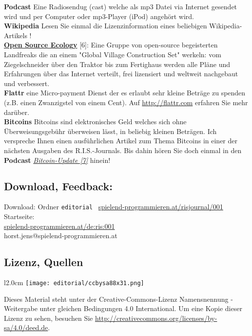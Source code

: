 \documentclass[10pt,a4paper,ngerman,twoside]{article} %
\begin{document}
\textbf{Podcast} Eine Radiosendug (cast) welche als mp3 Datei via Internet gesendet wird und per Computer oder mp3-Player (iPod) angehört wird. \\

\textbf{Wikipedia} Lesen Sie einmal die Lizenzinformation eines beliebigen Wikipedia-Artikels ! \\

\href{http://opensourceecology.org/}{\textbf{Open Source Ecology}} [6]: Eine Gruppe von open-source begeisterten  Landfreaks die an einem "Global Village Construction Set" werkeln: vom Ziegelschneider über den Traktor bis zum Fertighaus werden alle Pläne und Erfahrungen über das Internet verteilt, frei lizensiert und weltweit nachgebaut und verbessert.\\

\textbf{Flattr} eine Micro-payment Dienst der es erlaubt sehr kleine Beträge  zu spenden (z.B. einen Zwanzigstel von einem Cent). Auf \url{http://flattr.com} erfahren Sie mehr darüber.\\

\textbf{Bitcoins} Bitcoins sind elektronisches Geld welches sich ohne Überweisungsgebühr überweisen lässt, in beliebig kleinen Beträgen. Ich verspreche Ihnen einen ausführlichen Artikel zum Thema Bitcoins in einer der nächsten Ausgaben des R.I.S.-Journals. Bis dahin hören Sie doch einmal in den \textbf{Podcast}  \href{http://www.bitcoinupdate.com/}{\textit{Bitcoin-Update [7]}} hinein!

\subsection*{Download, Feedback:}
\footnotesize{
Download: Ordner \texttt{editorial} \Mundus\ \href{http://spielend-programmieren.at/risjournal/001}{spielend-programmieren.at/risjournal/001}\\
Startseite:\\
\href{http://spielend-programmieren.at/de:ris:001}{spielend-programmieren.at/de:ris:001}\\ 
\Letter\: horst.jens@spielend-programmieren.at}
\normalsize

\subsection*{Lizenz, Quellen} 
\begin{wrapfigure}{l}{2.0cm}
\texttt{[image: editorial/ccbysa88x31.png]}
\end{wrapfigure}
Dieses Material steht unter der Creative-Commons-Lizenz Namensnennung - Weitergabe unter gleichen Bedingungen 4.0 International. Um eine Kopie dieser Lizenz zu sehen, besuchen Sie \url{http://creativecommons.org/licenses/by-sa/4.0/deed.de}.
\end{document}
